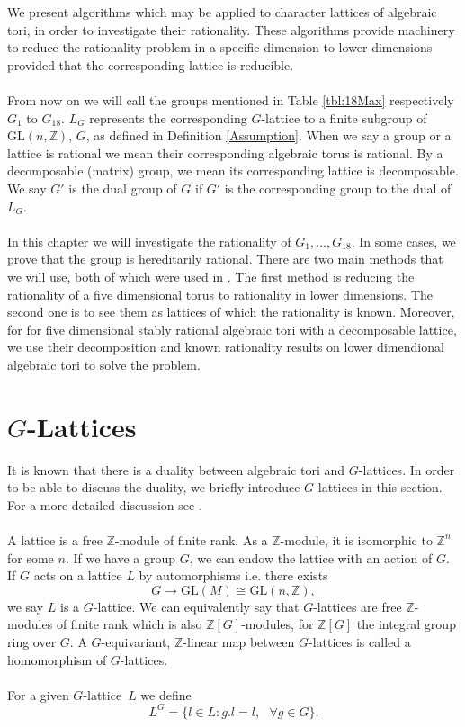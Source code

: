 \documentclass[a4paper, 14pt]{extarticle}
\theoremstyle{plain}
\theoremstyle{definition}
\newcommand{\Z}{\ensuremath{\mathbb{Z}}}
\newcommand{\G}{G}
\newcommand{\glat}{$G$-lattice}
\begin{document}
We present algorithms which may be applied to character lattices of algebraic 
tori, in order to investigate their rationality. These algorithms provide 
machinery to reduce the rationality problem in a specific dimension to lower dimensions
provided that the corresponding lattice is reducible.\\
\\
From now on we will call the groups mentioned in Table \ref{tbl:18Max} 
respectively $G_1$ to $G_{18}$. $L_G$ represents the corresponding $G$-lattice 
to a finite subgroup of $\mathrm{GL}(n,\Z)$, $G$, as defined in Definition 
\ref{Assumption}. When we say a group or a lattice is rational we mean their 
corresponding algebraic torus is rational. By a decomposable (matrix) group, 
we mean its corresponding lattice is decomposable. We say $G'$ is the dual 
group of $G$ if $G'$ is the corresponding group to the dual of $L_G$.  \\
\\
In this chapter we will investigate the rationality of $G_1, \ldots ,  G_{18}$. 
In some cases, we prove that the group is hereditarily rational. There are two 
main methods that we will use, both of which were used in \cite{Nicole1}. The 
first method is reducing the rationality of a five dimensional torus to rationality 
in lower dimensions. The second one is to see them as lattices of which the rationality is known.
Moreover, for for five dimensional stably rational algebraic tori with a decomposable lattice,
we use their decomposition and known rationality results on lower dimendional algebraic tori to
solve the problem.

\section{$G$-Lattices}\label{G-Lattices}
It is known that there is a duality between algebraic tori and \glat s. In order to be able to discuss the duality, we briefly introduce \glat s in this section. For a more detailed discussion see \cite[Chapters 1 and 2]{Lorenz}.\\ \\
A lattice is a free $\mathbb{Z}$-module of finite rank. As a $\Z$-module, it is isomorphic to $\mathbb{Z}^n$ for some $n$. If we have a group $G$, we can endow the lattice with an action of $G$. If $G$ acts on a lattice $L$ by automorphisms i.e. there exists $$ G \longrightarrow \mathrm{GL}(M) \cong \mathrm{GL}(n,\mathbb{Z}),$$ 
we say $L$ is a $G$-lattice. We can equivalently say that $\G$-lattices are free $\Z$-modules of finite rank which is also $\mathbb{Z}[G]$-modules, for $\mathbb{Z}[G]$ the integral group ring over $G$. A $G$-equivariant, $ \mathbb{Z}$-linear map between $G$-lattices is called a homomorphism of $G$-lattices.\\
\\For a given \glat \, $L$ we define $$ L^\G = \lbrace l \in L : g.l=l,  \,\, \,\,  \forall g \in \G \rbrace. $$
\end{document}
